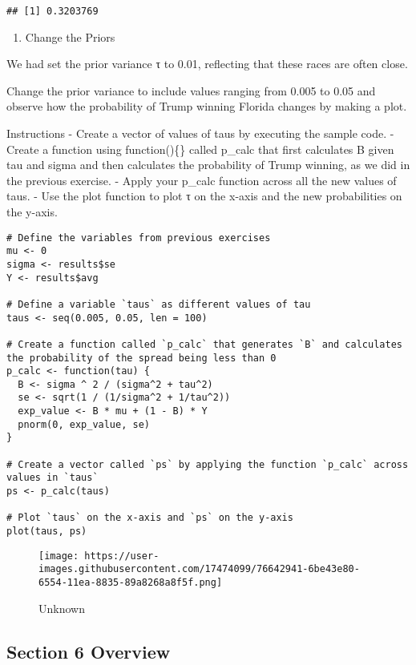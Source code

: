\documentclass[
]{article}
\providecommand{\tightlist}{%
  \setlength{\itemsep}{0pt}\setlength{\parskip}{0pt}}
\begin{document}
\begin{verbatim}
## [1] 0.3203769
\end{verbatim}

\begin{enumerate}
\def\labelenumi{\arabic{enumi}.}
\setcounter{enumi}{11}
\tightlist
\item
  Change the Priors
\end{enumerate}

We had set the prior variance τ to 0.01, reflecting that these races are
often close.

Change the prior variance to include values ranging from 0.005 to 0.05
and observe how the probability of Trump winning Florida changes by
making a plot.

Instructions - Create a vector of values of taus by executing the sample
code. - Create a function using function()\{\} called p\_calc that first
calculates B given tau and sigma and then calculates the probability of
Trump winning, as we did in the previous exercise. - Apply your p\_calc
function across all the new values of taus. - Use the plot function to
plot τ on the x-axis and the new probabilities on the y-axis.

\begin{verbatim}
# Define the variables from previous exercises
mu <- 0
sigma <- results$se
Y <- results$avg

# Define a variable `taus` as different values of tau
taus <- seq(0.005, 0.05, len = 100)

# Create a function called `p_calc` that generates `B` and calculates the probability of the spread being less than 0
p_calc <- function(tau) {
  B <- sigma ^ 2 / (sigma^2 + tau^2)
  se <- sqrt(1 / (1/sigma^2 + 1/tau^2))
  exp_value <- B * mu + (1 - B) * Y
  pnorm(0, exp_value, se)
}

# Create a vector called `ps` by applying the function `p_calc` across values in `taus`
ps <- p_calc(taus)

# Plot `taus` on the x-axis and `ps` on the y-axis
plot(taus, ps)
\end{verbatim}

\begin{figure}
\centering
\texttt{[image: https://user-images.githubusercontent.com/17474099/76642941-6be43e80-6554-11ea-8835-89a8268a8f5f.png]}
\caption{Unknown}
\end{figure}

\hypertarget{section-6-overview}{%
\subsection{Section 6 Overview}\label{section-6-overview}}
\end{document}
